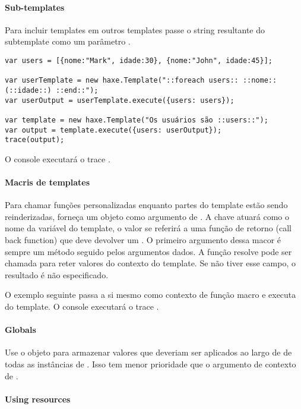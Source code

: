 {\paragraph{Sub-templates}
Para incluir templates em outros templates passe o string resultante do subtemplate como um parâmetro
.
\begin{lstlisting} 
var users = [{nome:"Mark", idade:30}, {nome:"John", idade:45}];

var userTemplate = new haxe.Template("::foreach users:: ::nome::(::idade::) ::end::");
var userOutput = userTemplate.execute({users: users});

var template = new haxe.Template("Os usuários são ::users::");
var output = template.execute({users: userOutput});
trace(output);
\end{lstlisting} 
O console executará o trace .

\paragraph{Macris de templates}

Para chamar funções personalizadas enquanto partes do template estão sendo reinderizadas, forneça um objeto  como argumento de . A chave atuará como o nome da variável do template, o valor se referirá a uma função de retorno (call back function) que deve devolver um . O primeiro argumento dessa macor é sempre um método  seguido pelos argumentos dados. A função resolve pode ser chamada para reter valores do contexto do template. Se  não tiver esse campo, o resultado é não especificado.

O exemplo seguinte passa a si mesmo como contexto de função macro e executa  do template.
O console executará o trace .

\paragraph{Globals}
Use o objeto  para armazenar valores que deveriam ser aplicados ao largo de de todas as instâncias de . Isso tem menor prioridade que o argumento de contexto de .

\paragraph{Using resources}

}
